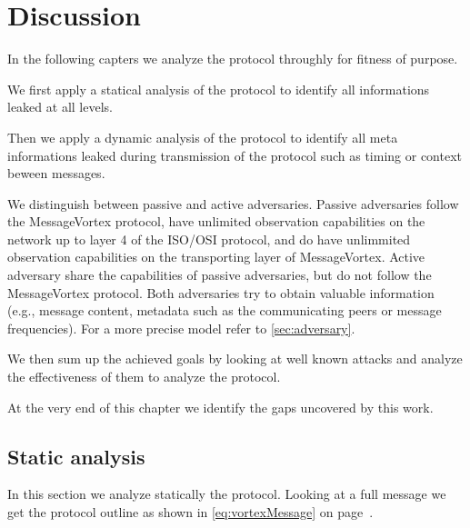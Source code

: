 
\part{Discussion \label{sec:discussion}}

In the following capters we analyze the protocol throughly for fitness of purpose. 

We first apply a statical analysis of the protocol to identify all informations leaked at all levels.

Then we apply a dynamic analysis of the protocol to identify all meta informations leaked during transmission of the protocol such as timing or context beween messages.

We distinguish between passive and active adversaries. Passive adversaries follow the MessageVortex protocol, have unlimited observation capabilities on the network up to layer 4 of the ISO/OSI protocol, and do have unlimmited observation capabilities on the transporting layer of MessageVortex. Active adversary share the capabilities of passive adversaries, but do not follow the MessageVortex protocol. Both adversaries try to obtain valuable information (e.g., message content, metadata such as the communicating peers or message frequencies). For a more precise model refer to \ref{sec:adversary}.

We then sum up the achieved goals by looking at well known attacks and analyze the effectiveness of them to analyze the protocol.

At the very end of this chapter we identify the gaps uncovered by this work.

\chapter{Static analysis}
In this section we analyze statically the protocol. Looking at a full message we get the protocol outline as shown in \eqref{eq:vortexMessage} on page~\pageref{eq:vortexMessage}.

